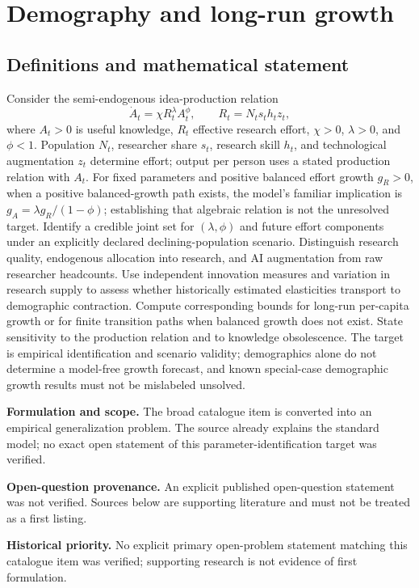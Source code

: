 \documentclass[11pt]{article}
\begin{document}
\section*{Demography and long-run growth}\label{30007550}
\subsection{Definitions and mathematical statement}
Consider the semi-endogenous idea-production relation
\[
\dot A_t=\chi R_t^\lambda A_t^\phi,\qquad
R_t=N_t s_t h_t z_t,
\]
where \(A_t>0\) is useful knowledge, \(R_t\) effective research effort, \(\chi>0\), \(\lambda>0\), and \(\phi<1\). Population \(N_t\), researcher share \(s_t\), research skill \(h_t\), and technological augmentation \(z_t\) determine effort; output per person uses a stated production relation with \(A_t\). For fixed parameters and positive balanced effort growth \(g_R>0\), when a positive balanced-growth path exists, the model’s familiar implication is \(g_A=\lambda g_R/(1-\phi)\); establishing that algebraic relation is not the unresolved target.
Identify a credible joint set for \((\lambda,\phi)\) and future effort components under an explicitly declared declining-population scenario. Distinguish research quality, endogenous allocation into research, and AI augmentation from raw researcher headcounts. Use independent innovation measures and variation in research supply to assess whether historically estimated elasticities transport to demographic contraction. Compute corresponding bounds for long-run per-capita growth or for finite transition paths when balanced growth does not exist. State sensitivity to the production relation and to knowledge obsolescence. The target is empirical identification and scenario validity; demographics alone do not determine a model-free growth forecast, and known special-case demographic growth results must not be mislabeled unsolved.

\par\textbf{Formulation and scope.} The broad catalogue item is converted into an empirical generalization problem. The source already explains the standard model; no exact open statement of this parameter-identification target was verified.

\par\textbf{Open-question provenance.} An explicit published open-question statement was not verified. Sources below are supporting literature and must not be treated as a first listing.

\par\textbf{Historical priority.} No explicit primary open-problem statement matching this catalogue item was verified; supporting research is not evidence of first formulation.
\end{document}

